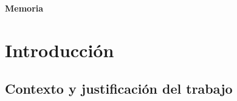 \documentclass[IB,BIB]{TFUOC}%
\begin{document}
\Huge
\vfill

\textbf{Memoria}
\normalsize

\newpage






\chapter{Introducción}
\label{chap:Introducción}


\section{Contexto y justificación del trabajo}
\label{sec:Contexto y justificación del trabajo}



%
%
%
%
%
%
%
\end{document}
